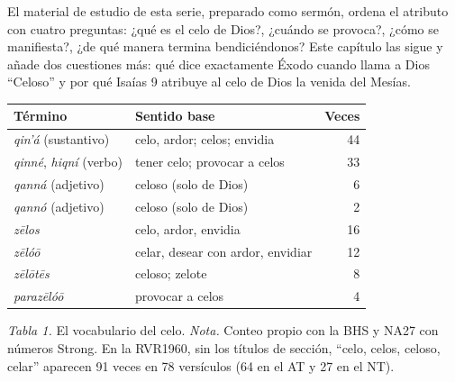 
El material de estudio de esta serie, preparado como sermón, ordena el atributo con cuatro preguntas: ¿qué es el celo de Dios?, ¿cuándo se provoca?, ¿cómo se manifiesta?, ¿de qué manera termina bendiciéndonos? Este capítulo las sigue y añade dos cuestiones más: qué dice exactamente Éxodo cuando llama a Dios ``Celoso'' y por qué Isaías 9 atribuye al celo de Dios la venida del Mesías.

\begin{center}\small\renewcommand{\arraystretch}{1.18}
\begin{tabular}{@{}L{5.2cm}L{5.0cm}r@{}}
\toprule
\textbf{Término} & \textbf{Sentido base} & \textbf{Veces} \\ \midrule
{} \emph{qin'á} (sustantivo) & celo, ardor; celos; envidia & 44 \\
 \emph{qinné},  \emph{hiqní} (verbo) & tener celo; provocar a celos & 33 \\
 \emph{qanná} (adjetivo) & celoso (solo de Dios) & 6 \\
 \emph{qannó} (adjetivo) & celoso (solo de Dios) & 2 \\ \midrule
{} \emph{zēlos} & celo, ardor, envidia & 16 \\
 \emph{zēlóō} & celar, desear con ardor, envidiar & 12 \\
 \emph{zēlōtēs} & celoso; zelote & 8 \\
 \emph{parazēlóō} & provocar a celos & 4 \\
\bottomrule
\end{tabular}\par
{\footnotesize\color{gris}\textit{Tabla 1.} El vocabulario del celo. \textit{Nota.} Conteo propio con la BHS y NA27 con números Strong. En la RVR1960, sin los títulos de sección, ``celo, celos, celoso, celar'' aparecen 91 veces en 78 versículos (64 en el AT y 27 en el NT).}
\end{center}


